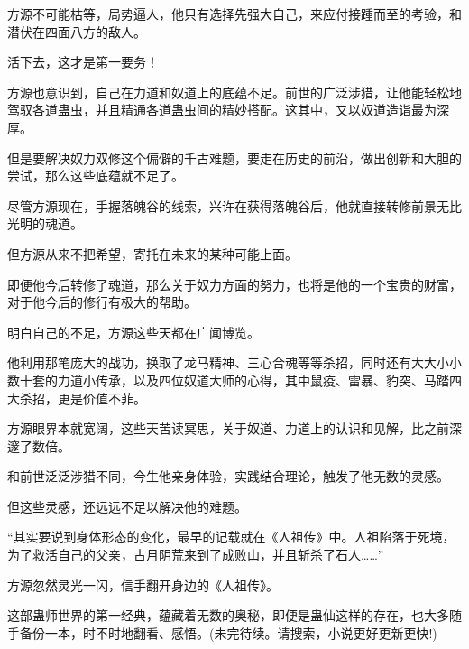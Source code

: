\begin{this_body}
方源不可能枯等，局势逼人，他只有选择先强大自己，来应付接踵而至的考验，和潜伏在四面八方的敌人。

活下去，这才是第一要务！

方源也意识到，自己在力道和奴道上的底蕴不足。前世的广泛涉猎，让他能轻松地驾驭各道蛊虫，并且精通各道蛊虫间的精妙搭配。这其中，又以奴道造诣最为深厚。

但是要解决奴力双修这个偏僻的千古难题，要走在历史的前沿，做出创新和大胆的尝试，那么这些底蕴就不足了。

尽管方源现在，手握落魄谷的线索，兴许在获得落魄谷后，他就直接转修前景无比光明的魂道。

但方源从来不把希望，寄托在未来的某种可能上面。

即便他今后转修了魂道，那么关于奴力方面的努力，也将是他的一个宝贵的财富，对于他今后的修行有极大的帮助。

明白自己的不足，方源这些天都在广闻博览。

他利用那笔庞大的战功，换取了龙马精神、三心合魂等等杀招，同时还有大大小小数十套的力道小传承，以及四位奴道大师的心得，其中鼠疫、雷暴、豹突、马踏四大杀招，更是价值不菲。

方源眼界本就宽阔，这些天苦读冥思，关于奴道、力道上的认识和见解，比之前深邃了数倍。

和前世泛泛涉猎不同，今生他亲身体验，实践结合理论，触发了他无数的灵感。

但这些灵感，还远远不足以解决他的难题。

“其实要说到身体形态的变化，最早的记载就在《人祖传》中。人祖陷落于死境，为了救活自己的父亲，古月阴荒来到了成败山，并且斩杀了石人……”

方源忽然灵光一闪，信手翻开身边的《人祖传》。

这部蛊师世界的第一经典，蕴藏着无数的奥秘，即便是蛊仙这样的存在，也大多随手备份一本，时不时地翻看、感悟。(未完待续。请搜索，小说更好更新更快!)

\end{this_body}

